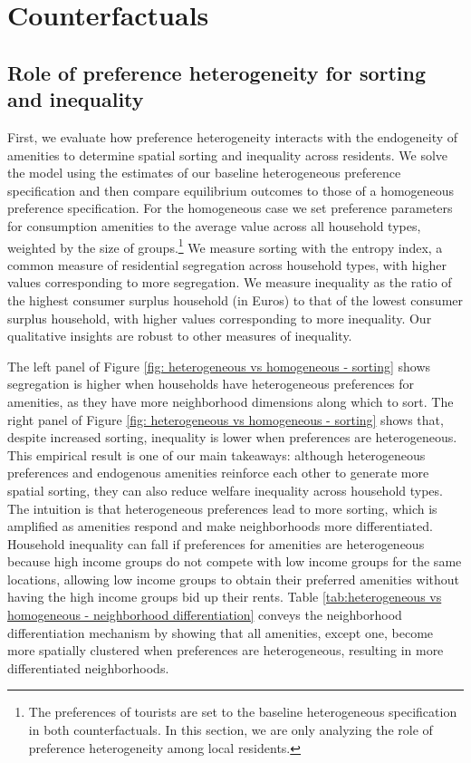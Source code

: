 \documentclass[11pt]{article}
\begin{document}
\section{Counterfactuals}\label{sec: counterfactuals}


\subsection{Role of preference heterogeneity for sorting and inequality}\label{sec: counterfactuals - heterogeneity}

First, we evaluate how preference heterogeneity interacts with the endogeneity of amenities to determine spatial sorting and inequality across residents. We solve the model using the estimates of our baseline heterogeneous preference specification and then compare equilibrium outcomes to those of a homogeneous preference specification. For the homogeneous case we set preference parameters for consumption amenities to the average value across all household types, weighted by the size of groups.\footnote{The preferences of tourists are set to the baseline heterogeneous specification in both counterfactuals. In this section, we are only analyzing the role of preference heterogeneity among local residents.} We measure sorting with the entropy index, a common measure of residential segregation across household types, with higher values corresponding to more segregation. We measure inequality as the ratio of the highest consumer surplus household (in Euros) to that of the lowest consumer surplus household, with higher values corresponding to more inequality. Our qualitative insights are robust to other measures of inequality.

The left panel of Figure \ref{fig: heterogeneous vs homogeneous - sorting} shows segregation is higher when households have heterogeneous preferences for amenities, as they have more neighborhood dimensions along which to sort. The right panel of Figure \ref{fig: heterogeneous vs homogeneous - sorting} shows that, despite increased sorting, inequality is lower when preferences are heterogeneous. This empirical result is one of our main takeaways: although heterogeneous preferences and endogenous amenities reinforce each other to generate more spatial sorting, they can also reduce welfare inequality across household types. The intuition is that heterogeneous preferences lead to more sorting, which is amplified as amenities respond and make neighborhoods more differentiated. Household inequality can fall if preferences for amenities are heterogeneous because high income groups do not compete with low income groups for the same locations, allowing low income groups to obtain their preferred amenities without having the high income groups bid up their rents. Table \ref{tab:heterogeneous vs homogeneous - neighborhood differentiation} conveys the neighborhood differentiation mechanism by showing that all amenities, except one, become more spatially clustered when preferences are heterogeneous, resulting in more differentiated neighborhoods.
\end{document}
